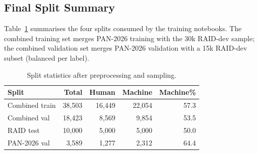 \subsection{Final Split Summary}
\label{subsec:splits}

Table~\ref{tab:splits} summarises the four splits consumed by the training notebooks.
The combined training set merges PAN-2026 training with the 30k RAID-dev sample;
the combined validation set merges PAN-2026 validation with a 15k RAID-dev subset
(balanced per label).

\begin{table}[t]
  \caption{Split statistics after preprocessing and sampling.}
  \label{tab:splits}
  \centering
  \begin{tabular}{lrrrr}
    \toprule
    Split & Total & Human & Machine & Machine\% \\
    \midrule
    Combined train & 38,503 & 16,449 & 22,054 & 57.3 \\
    Combined val   & 18,423 &  8,569 &  9,854 & 53.5 \\
    RAID test      & 10,000 &  5,000 &  5,000 & 50.0 \\
    PAN-2026 val   &  3,589 &  1,277 &  2,312 & 64.4 \\
    \bottomrule
  \end{tabular}
\end{table}
